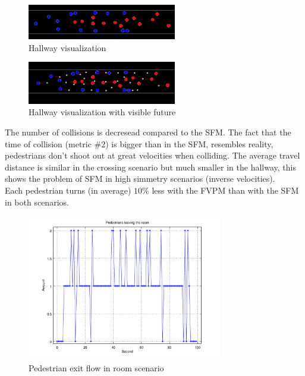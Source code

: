 \documentclass[english]{article}
\begin{document}
\vspace{1cm}

\begin{figure}[h]
    \begin{centering}
    \includegraphics[width=6.5cm]{pics/program/hallway-no-future} 
    \par\end{centering}
    
    \caption{\label{fig:hallway-no-future}Hallway visualization}
\end{figure}


\begin{figure}[h]
    \begin{centering}
    \includegraphics[width=6.5cm]{pics/program/hallway-future} 
    \par\end{centering}
    
    \caption{\label{fig:hallway-future}Hallway visualization with visible future}
\end{figure}


The number of collisions is decresead compared to the SFM. The fact
that the time of collision (metric \#2) is bigger than in the SFM,
resembles reality, pedestrians don't shoot out at great velocities
when colliding. The average travel distance is similar in the crossing
scenario but much smaller in the hallway, this shows the problem of
SFM in high simmetry scenarios (inverse velocities). \\
 Each pedestrian turns (in average) $10\%$ less with the FVPM than
with the SFM in both scenarios. \\


\begin{figure}[h]
    \begin{centering}
    \includegraphics[width=8.5cm]{pics/steps/room} 
    \par\end{centering}
    
    \caption{\label{fig:room-flow}Pedestrian exit flow in room scenario}
\end{figure}
\end{document}
